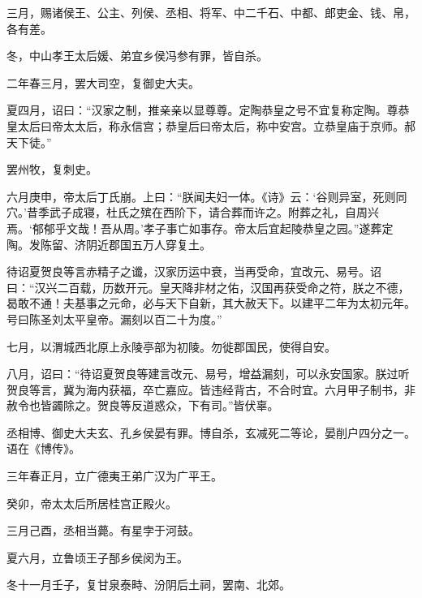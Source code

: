 \documentclass[12pt,UTF8]{ctexbook}
\begin{document}
三月，赐诸侯王、公主、列侯、丞相、将军、中二千石、中都、郎吏金、钱、帛，各有差。



冬，中山孝王太后媛、弟宜乡侯冯参有罪，皆自杀。



二年春三月，罢大司空，复御史大夫。



夏四月，诏曰：“汉家之制，推亲亲以显尊尊。定陶恭皇之号不宜复称定陶。尊恭皇太后曰帝太太后，称永信宫；恭皇后曰帝太后，称中安宫。立恭皇庙于京师。郝天下徒。”



罢州牧，复刺史。



六月庚申，帝太后丁氏崩。上曰：“朕闻夫妇一体。《诗》云：‘谷则异室，死则同穴。’昔季武子成寝，杜氏之殡在西阶下，请合葬而许之。附葬之礼，自周兴焉。‘郁郁乎文哉！吾从周。’孝子事亡如事存。帝太后宜起陵恭皇之园。”遂葬定陶。发陈留、济阴近郡国五万人穿复土。



待诏夏贺良等言赤精子之谶，汉家历运中衰，当再受命，宜改元、易号。诏曰：“汉兴二百载，历数开元。皇天降非材之佑，汉国再获受命之符，朕之不德，曷敢不通！夫基事之元命，必与天下自新，其大赦天下。以建平二年为太初元年。号曰陈圣刘太平皇帝。漏刻以百二十为度。”



七月，以渭城西北原上永陵亭部为初陵。勿徙郡国民，使得自安。



八月，诏曰：“待诏夏贺良等建言改元、易号，增益漏刻，可以永安国家。朕过听贺良等言，冀为海内获福，卒亡嘉应。皆违经背古，不合时宜。六月甲子制书，非赦令也皆蠲除之。贺良等反道惑众，下有司。”皆伏辜。



丞相博、御史大夫玄、孔乡侯晏有罪。博自杀，玄减死二等论，晏削户四分之一。语在《博传》。



三年春正月，立广德夷王弟广汉为广平王。



癸卯，帝太太后所居桂宫正殿火。



三月己酉，丞相当薨。有星孛于河鼓。



夏六月，立鲁顷王子郚乡侯闵为王。



冬十一月壬子，复甘泉泰畤、汾阴后土祠，罢南、北郊。
\end{document}
